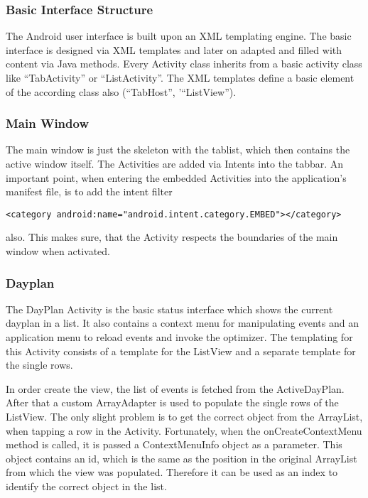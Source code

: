 \subsubsection{Basic Interface Structure} %
\label{ssub:Basic Interface Structure}
The Android user interface is built upon an XML templating engine.
The basic interface is designed via XML templates and later on adapted
and filled with content via Java methods. Every Activity class inherits
from a basic activity class like ``TabActivity'' or ``ListActivity''.
The XML templates define a basic element of the according class also
(``TabHost'', '``ListView'').


\subsubsection{Main Window} %
\label{ssub:MainWindow}

The main window is just the skeleton with the tablist, which then
contains the active window itself. The Activities are added
via Intents into the tabbar. An important point, when entering the embedded
Activities into the application's manifest file, is to add the intent filter
\begin{verbatim}
<category android:name="android.intent.category.EMBED"></category>
\end{verbatim}
also. This makes sure, that the Activity respects the boundaries of the
main window when activated.


\subsubsection{Dayplan} %
\label{ssub:Dayplan}
The DayPlan Activity is the basic status interface which shows the current
dayplan in a list. It also contains a context menu for manipulating events
and an application menu to reload events and invoke the optimizer. The
templating for this Activity consists of a template for the ListView and a
separate template for the single rows.

In order create the view, the list of events is fetched from the
ActiveDayPlan. After that a custom ArrayAdapter is used to populate the
single rows of the ListView.
The only slight problem is to get the correct object from the ArrayList,
when tapping a row in the Activity. Fortunately, when the onCreateContextMenu
method is called, it is passed a ContextMenuInfo object as a parameter. This
object contains an id, which is the same as the position in the original
ArrayList from which the view was populated. Therefore it can be used as an
index to identify the correct object in the list.


